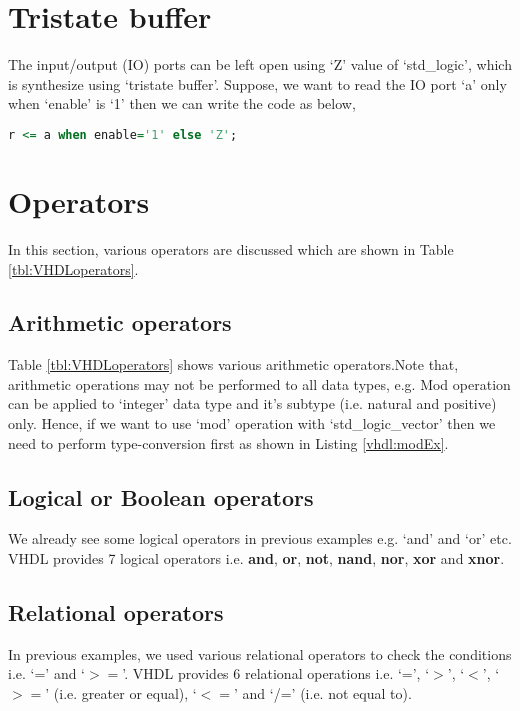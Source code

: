 \section{Tristate buffer}
The input/output (IO) ports can be left open using `Z' value of `std\_logic', which is synthesize using `tristate buffer'. Suppose, we want to read the IO port `a' only when `enable' is `1' then we can write the code as below, 

\begin{lstlisting}[language=Vhdl, caption={Architecture body}, label= {vhdl:architectureBody}]
r <= a when enable='1' else 'Z'; 
\end{lstlisting}


\section{Operators}\label{sec:opearators}
In this section, various operators are discussed which are shown in Table \ref{tbl:VHDLoperators}. 

\subsection{Arithmetic operators}
Table \ref{tbl:VHDLoperators} shows various arithmetic operators.Note that, arithmetic operations may not be performed to all data types, e.g. Mod operation can be applied to `integer' data type and it's subtype (i.e. natural and positive) only. Hence, if we want to use  `mod' operation with `std\_logic\_vector' then we need to perform type-conversion first as shown in Listing \ref{vhdl:modEx}. 

\subsection{Logical or Boolean operators}
We already see some logical operators in previous examples e.g. `and' and `or' etc. VHDL provides 7 logical operators i.e. \textbf{and}, \textbf{or}, \textbf{not}, \textbf{nand}, \textbf{nor}, \textbf{xor} and \textbf{xnor}.

\subsection{Relational operators}
In previous examples, we used various relational operators to check the conditions i.e. `=' and `$>=$'. VHDL provides 6 relational operations i.e. `=', `$>$', `$<$', `$>=$' (i.e. greater or equal), `$<=$' and `/=' (i.e. not equal to). 

